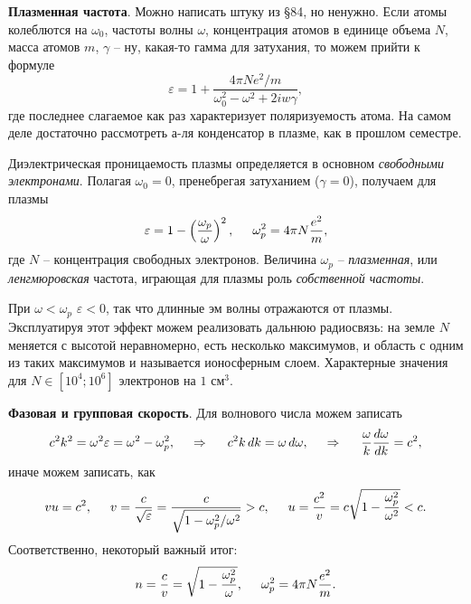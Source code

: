 


\textbf{Плазменная частота}. Можно написать штуку из \S 84, но ненужно. 
Если атомы колеблются на $\omega_0$, частоты волны $\omega$, концентрация атомов в единице объема $N$, масса атомов $m$, $\gamma$ -- ну, какая-то гамма для затухания, то можем прийти к формуле
\begin{equation*}
    \varepsilon = 1 + \frac{4 \pi N e^2/m}{\omega_0^2 - \omega^2 + 2 i w \gamma},
\end{equation*}
где последнее слагаемое как раз характеризует поляризуемость атома. 
На самом деле достаточно рассмотреть а-ля конденсатор в плазме, как в прошлом семестре. 

Диэлектрическая проницаемость плазмы определяется в основном \textit{свободными электронами}. Полагая $\omega_0 = 0$, пренебрегая затуханием ($\gamma=0$), получаем для плазмы
\begin{equation*}
    \varepsilon = 1 - \left(\frac{\omega_p}{\omega}\right)^2,
    \hspace{5 mm} 
    \omega_p^2 = 4 \pi N\frac{e^2}{m},
\end{equation*}
где $N$ -- концентрация свободных электронов. Величина $\omega_p$ -- \textit{плазменная}, или \textit{ленгмюровская} частота, играющая для плазмы роль \textit{собственной частоты}. 



При $\omega < \omega_p$ $\varepsilon < 0$, так что длинные эм волны отражаются от плазмы. Эксплуатируя этот эффект можем реализовать дальнюю радиосвязь: на земле $N$ меняется с высотой неравномерно, есть несколько максимумов, и область с одним из таких максимумов и называется ионосферным слоем. Характерные значения для $N \in [10^4; 10^6]$ электронов на $1$ см$^3$. 


\textbf{Фазовая и групповая скорость}. Для волнового числа можем записать
\begin{equation*}
    c^2 k^2 = \omega^2 \varepsilon = \omega^2 - \omega^2_p,
    \hspace{0.5cm} \Rightarrow \hspace{0.5cm}   
    c^2 k \, d k = \omega \, d \omega,
    \hspace{0.5cm} \Rightarrow \hspace{0.5cm}
    \frac{\omega}{k} \frac{d \omega}{d k}  = c^2,
\end{equation*}
иначе можем записать, как
\begin{equation*}
    v u = c^2, \hspace{5 mm} 
    v = \frac{c}{\sqrt{\varepsilon}} = \frac{c}{\sqrt{1-\omega_p^2/\omega^2}} > c,
    \hspace{5 mm} 
    u = \frac{c^2}{v} = c \sqrt{1- \frac{\omega_p^2}{\omega^2}} < c.
\end{equation*}
Соответственно, некоторый важный итог:
\begin{equation*}
    n = \frac{c}{v} = \sqrt{1- \frac{\omega_p^2}{\omega}}, \hspace{5 mm} 
    \omega_p^2 = 4 \pi N \frac{e^2}{m}.
\end{equation*}